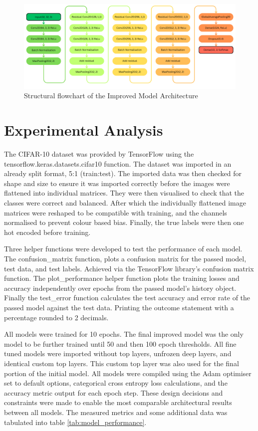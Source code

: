 \documentclass[10pt,twocolumn,letterpaper]{article}
\begin{document}
\begin{figure}[t]
    \centering
    \includegraphics[width=\textwidth, height=0.3\textheight]{improved student model diagram croppped.png}
    \caption{Structural flowchart of the Improved Model Architecture}
    \label{fig:improved model}
\end{figure}

\section{Experimental Analysis}
\label{sec:expana}
The CIFAR-10 dataset was provided by TensorFlow using the tensorflow.keras.datasets.cifar10 function. The dataset was imported in an already split format, 5:1 (train:test). The imported data was then checked for shape and size to ensure it was imported correctly before the images were flattened into individual matrices. They were then visualised to check that the classes were correct and balanced. After which the individually flattened image matrices were reshaped to be compatible with training, and the channels normalised to prevent colour based bias. Finally, the true labels were then one hot encoded before training. 

Three helper functions were developed to test the performance of each model. The confusion\_matrix function, plots a confusion matrix for the passed model, test data, and test labels. Achieved via the TensorFlow library's confusion matrix function. The plot\_performance helper function plots the training losses and accuracy independently over epochs from the passed model's history object. Finally the test\_error function calculates the test accuracy and error rate of the passed model against the test data. Printing the outcome statement with a percentage rounded to 2 decimals. 

All models were trained for 10 epochs. The final improved model was the only model to be further trained until 50 and then 100 epoch thresholds. All fine tuned models were imported without top layers, unfrozen deep layers, and identical custom top layers. This custom top layer was also used for the final portion of the initial model. All models were compiled using the Adam optimiser set to default options, categorical cross entropy loss calculations, and the accuracy metric output for each epoch step. These design decisions and constraints were made to enable the most comparable architectural results between all models. The measured metrics and some additional data was tabulated into table \ref{tab:model_performance}. 
\end{document}
